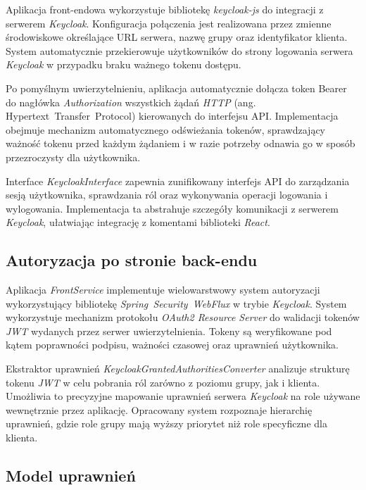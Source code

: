 Aplikacja front-endowa wykorzystuje bibliotekę \textit{keycloak-js} do integracji z serwerem \textit{Keycloak}. Konfiguracja połączenia jest realizowana przez zmienne środowiskowe określające URL serwera, nazwę grupy oraz identyfikator klienta. System automatycznie przekierowuje użytkowników do strony logowania serwera \textit{Keycloak} w przypadku braku ważnego tokenu dostępu.

Po pomyślnym uwierzytelnieniu, aplikacja automatycznie dołącza token Bearer do nagłówka \textit{Authorization} wszystkich żądań \textit{HTTP} (ang. \mbox{Hypertext Transfer Protocol}) kierowanych do interfejsu API. Implementacja obejmuje mechanizm automatycznego odświeżania tokenów, sprawdzający ważność tokenu przed każdym żądaniem i w razie potrzeby odnawia go w sposób przezroczysty dla użytkownika.

Interface \textit{KeycloakInterface} zapewnia zunifikowany interfejs API do zarządzania sesją użytkownika, sprawdzania ról oraz wykonywania operacji logowania i wylogowania. Implementacja ta abstrahuje szczegóły komunikacji z serwerem \textit{Keycloak}, ułatwiając integrację z komentami biblioteki \textit{React}.

\subsection{Autoryzacja po stronie back-endu}

Aplikacja \textit{FrontService} implementuje wielowarstwowy system autoryzacji wykorzystujący bibliotekę \mbox{\textit{Spring Security WebFlux}} w trybie \textit{Keycloak}. System wykorzystuje mechanizm protokołu \textit{OAuth2 Resource Server} do walidacji tokenów \mbox{\textit{JWT}} wydanych przez serwer uwierzytelnienia. Tokeny są weryfikowane pod kątem poprawności podpisu, ważności czasowej oraz uprawnień użytkownika.

Ekstraktor uprawnień \textit{KeycloakGrantedAuthoritiesConverter} analizuje strukturę tokenu \mbox{\textit{JWT}} w celu pobrania ról zarówno z poziomu grupy, jak i klienta. Umożliwia to precyzyjne mapowanie uprawnień serwera \textit{Keycloak} na role używane wewnętrznie przez aplikację. Opracowany system rozpoznaje hierarchię uprawnień, gdzie role grupy mają wyższy priorytet niż role specyficzne dla klienta.

\subsection{Model uprawnień}

